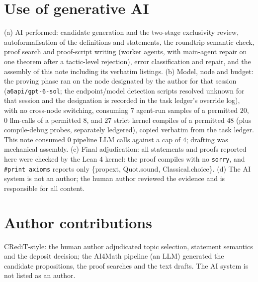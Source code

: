 \documentclass[11pt]{article}
\begin{document}
\section*{Use of generative AI}

(a) AI performed: candidate generation and the two-stage exclusivity review,
autoformalisation of the definitions and statements, the roundtrip semantic
check, proof search and proof-script writing (worker agents, with
main-agent repair on one theorem after a tactic-level rejection), error
classification and repair, and the assembly of this note including its
verbatim listings. (b) Model, node and budget: the proving phase ran on the
node designated by the author for that session (\texttt{a6api/gpt-6-sol};
the endpoint/model detection scripts resolved unknown for that session and
the designation is recorded in the task ledger's override log), with no
cross-node switching, consuming $7$ agent-run samples of a permitted $20$,
$0$ llm-calls of a permitted $8$, and $27$ strict kernel compiles of a
permitted $48$ (plus compile-debug probes, separately ledgered), copied
verbatim from the task ledger. This note consumed $0$ pipeline LLM calls
against a cap of $4$; drafting was mechanical assembly. (c) Final
adjudication: all statements and proofs reported here were checked by the
Lean 4 kernel: the proof compiles with no \texttt{sorry}, and
\texttt{\#print axioms} reports only \{propext, Quot.sound,
Classical.choice\}. (d) The AI system is not an author; the human author
reviewed the evidence and is responsible for all content.

\section*{Author contributions}

CRediT-style: the human author adjudicated topic selection, statement
semantics and the deposit decision; the AI4Math pipeline (an LLM) generated
the candidate propositions, the proof searches and the text drafts. The AI
system is not listed as an author.
\end{document}

